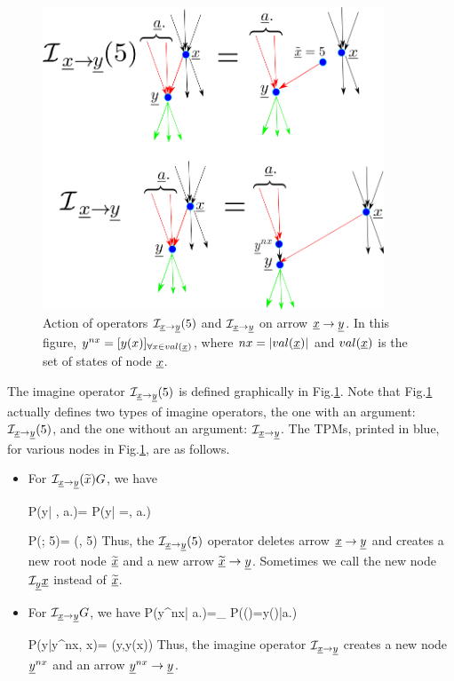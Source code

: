 \begin{figure}[h!]
\centering
\includegraphics[width=4in]
{counterf/kappa.png}
\caption{Action of  operators
$\cali_{\rvx\rarrow \rvy}(5)$
and $\cali_{\rvx\rarrow \rvy}$
on arrow $\rvx\rarrow \rvy$.
In this figure, $y^{nx}=[y(x)]_{\forall x\in val(\rvx)}$,
where $nx=|val(\rvx)|$
and $val(\rvx)$ is the set of states of node $\rvx$.
}
\label{fig-kappa}
\end{figure}

The imagine operator  $\cali_{\rvx\rarrow \rvy}(5)$
is defined graphically in Fig.\ref{fig-kappa}.
Note that Fig.\ref{fig-kappa}
actually defines two types
of imagine operators, the one
with an argument:
$\cali_{\rvx\rarrow \rvy}(5)$,
and the one without an argument:
$\cali_{\rvx\rarrow \rvy}$.
The TPMs, printed in blue,
for various nodes in
Fig.\ref{fig-kappa}, are as follows.



\begin{itemize}

\item
For $\cali_{\rvx\rarrow
\rvy}(\TIL{x})G$, we have

\beq\color{blue}
P(y| , a.)=
P(y| \rvx=, a.)
\eeq

\beq\color{blue}
P(; 5)=
\delta(, 5)
\eeq
Thus, the $\cali_{\rvx\rarrow\rvy}(5)$ operator 
deletes
arrow $\rvx\rarrow\rvy$
and
creates a new root node
$\TIL{\rvx}$
and a new arrow
$\TIL{\rvx}\rarrow \rvy$.
Sometimes we call
the new node
$\cali_\rvy\rvx$
instead of
 $\TIL{\rvx}$.

\item
For $\cali_{\rvx\rarrow \rvy}G$, we have
\beq\color{blue}
P(y^{nx}| a.)=\prod_{}
P(\rvy()=y()|a.)
\eeq

\beq\color{blue}
P(y|y^{nx}, x)=
\delta(y,y(x))
\eeq
Thus, the imagine operator 
$\cali_{\rvx\rarrow\rvy}$
creates
a new node $\rvy^{nx}$
and an arrow $\rvy^{nx}\rarrow \rvy$.

\end{itemize}

